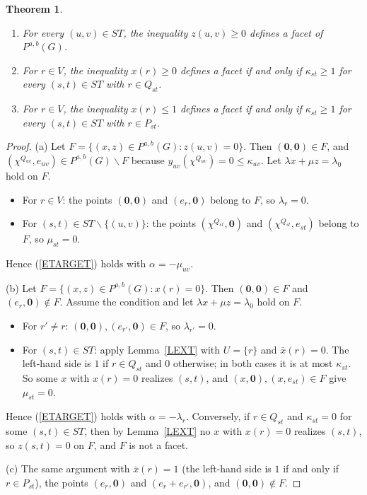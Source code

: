 \documentclass[a4paper,11pt]{article}
\newtheorem{thm}{Theorem}
\theoremstyle{definition}
\begin{document}
\begin{thm} \label{TBOUNDS}
\begin{enumerate}
\item[(a)] For every $(u,v) \in ST$, the inequality $z(u,v) \geq 0$ defines a facet of $P^{a,b}(G)$.
\item[(b)] For $r \in V$, the inequality $x(r) \geq 0$ defines a facet if and only if $\kappa_{st} \geq 1$ for every $(s,t) \in ST$
with $r \in Q_{st}$.
\item[(c)] For $r \in V$, the inequality $x(r) \leq 1$ defines a facet if and only if $\kappa_{st} \geq 1$ for every $(s,t) \in ST$
with $r \in P_{st}$.
\end{enumerate}
\end{thm}
\begin{proof}
(a) Let $F = \{ (x,z) \in P^{a,b}(G) : z(u,v) = 0 \}$. Then $(\mathbf{0},\mathbf{0}) \in F$, and $(\chi^{Q_{uv}}, e_{uv}) \in P^{a,b}(G) \backslash F$ because
$y_{uv}(\chi^{Q_{uv}}) = 0 \leq \kappa_{uv}$. Let $\lambda x + \mu z = \lambda_0$ hold on $F$.
\begin{itemize}
\item For $r \in V$: the points $(\mathbf{0},\mathbf{0})$ and $(e_r, \mathbf{0})$ belong to $F$, so $\lambda_r = 0$.
\item For $(s,t) \in ST \backslash \{(u,v)\}$: the points $(\chi^{Q_{st}}, \mathbf{0})$ and $(\chi^{Q_{st}}, e_{st})$ belong to $F$, so
$\mu_{st} = 0$.
\end{itemize}
Hence (\ref{ETARGET}) holds with $\alpha = -\mu_{uv}$.

(b) Let $F = \{ (x,z) \in P^{a,b}(G) : x(r) = 0 \}$. Then $(\mathbf{0},\mathbf{0}) \in F$ and $(e_r, \mathbf{0}) \notin F$.
Assume the condition and let $\lambda x + \mu z = \lambda_0$ hold on $F$.
\begin{itemize}
\item For $r' \neq r$: $(\mathbf{0},\mathbf{0}), (e_{r'}, \mathbf{0}) \in F$, so $\lambda_{r'} = 0$.
\item For $(s,t) \in ST$: apply Lemma~\ref{LEXT} with $U = \{r\}$ and $\bar{x}(r) = 0$. The left-hand side is $1$ if $r \in Q_{st}$
and $0$ otherwise; in both cases it is at most $\kappa_{st}$. So some $x$ with $x(r) = 0$ realizes $(s,t)$, and
$(x, \mathbf{0}), (x, e_{st}) \in F$ give $\mu_{st} = 0$.
\end{itemize}
Hence (\ref{ETARGET}) holds with $\alpha = -\lambda_r$. Conversely, if $r \in Q_{st}$ and $\kappa_{st} = 0$ for some $(s,t) \in ST$,
then by Lemma~\ref{LEXT} no $x$ with $x(r) = 0$ realizes $(s,t)$, so $z(s,t) = 0$ on $F$, and $F$ is not a facet.

(c) The same argument with $\bar{x}(r) = 1$ (the left-hand side is $1$ if and only if $r \in P_{st}$), the points $(e_r,\mathbf{0})$ and
$(e_r + e_{r'}, \mathbf{0})$, and $(\mathbf{0},\mathbf{0}) \notin F$.
\end{proof}
\end{document}
